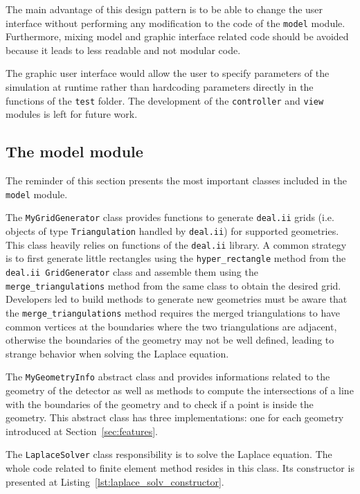 \documentclass[11pt]{article}
\begin{document}
	The main advantage of this design pattern is to be able to change the user interface without
	performing any modification to the code of the \texttt{model} module. Furthermore,
	mixing model and graphic interface related code should be avoided because it leads to
	less readable and not modular code.

	The graphic user interface would allow the user to specify
	parameters of the simulation at runtime rather than hardcoding parameters
	directly in the functions of the \texttt{test} folder.
	The development of the \texttt{controller} and \texttt{view} modules
	is left for future work.

\subsection{The model module}

	The reminder of this section presents the most important classes
	included in the \texttt{model} module.



The \texttt{MyGridGenerator} class provides functions to generate \texttt{deal.ii}
grids (i.e. objects of type \texttt{Triangulation} handled by \texttt{deal.ii}) for supported
geometries. This class heavily relies on functions of the \texttt{deal.ii}
library. A common strategy is to first generate
little rectangles using the \lstinline{hyper_rectangle} method from the
\texttt{deal.ii GridGenerator} class and assemble them using the \lstinline{merge_triangulations}
method from the same class to obtain the desired grid. Developers led to build
methods to generate
new geometries must be aware that the \lstinline{merge_triangulations} method
requires the merged triangulations to have common vertices at the boundaries
where the two triangulations are adjacent, otherwise
the boundaries of the geometry may not be well defined, leading to strange behavior
when solving the Laplace equation.

	The \texttt{MyGeometryInfo} abstract class and provides informations
	related to the
	geometry of the detector as well as methods to compute the intersections of a
	line with the boundaries of the geometry and to check if a point is inside
	the geometry. This abstract class has three implementations: one for each
	geometry introduced at Section~\ref{sec:features}.

The \texttt{LaplaceSolver} class responsibility is to solve the Laplace equation.
The whole code related to finite element method resides in this class.
Its constructor is presented at Listing~\ref{lst:laplace_solv_constructor}.
\newline
\end{document}
